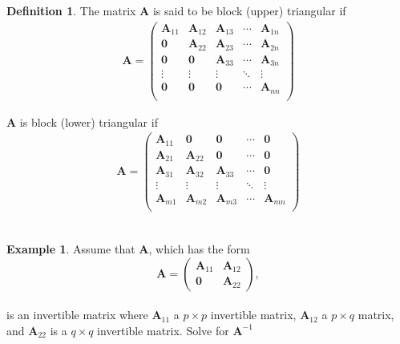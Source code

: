 \documentclass[
]{book}
\theoremstyle{definition}
\newtheorem{definition}{Definition}[chapter]
\theoremstyle{definition}
\newtheorem{example}{Example}[chapter]
\theoremstyle{definition}
\theoremstyle{remark}
\begin{document}
\begin{definition}
\protect\hypertarget{def:unnamed-chunk-153}{}{\label{def:unnamed-chunk-153} }The matrix \(\mathbf{A}\) is said to be block (upper) triangular if
\[
\begin{aligned}
\mathbf{A} = \begin{pmatrix} 
\mathbf{A}_{11} & \mathbf{A}_{12} & \mathbf{A}_{13} & \cdots & \mathbf{A}_{1n} \\
\mathbf{0} & \mathbf{A}_{22} & \mathbf{A}_{23} & \cdots & \mathbf{A}_{2n} \\
\mathbf{0} & \mathbf{0} & \mathbf{A}_{33} & \cdots & \mathbf{A}_{3n} \\
\vdots & \vdots & \vdots & \ddots & \vdots \\
\mathbf{0} & \mathbf{0} & \mathbf{0} & \cdots & \mathbf{A}_{nn} \\
\end{pmatrix}
\end{aligned}
\]

\(\mathbf{A}\) is block (lower) triangular if\\
\[
\begin{aligned}
\mathbf{A} = \begin{pmatrix} 
\mathbf{A}_{11} & \mathbf{0} & \mathbf{0} & \cdots & \mathbf{0} \\
\mathbf{A}_{21} & \mathbf{A}_{22} & \mathbf{0} & \cdots & \mathbf{0} \\
\mathbf{A}_{31} & \mathbf{A}_{32} & \mathbf{A}_{33} & \cdots & \mathbf{0} \\
\vdots & \vdots & \vdots & \ddots & \vdots \\
\mathbf{A}_{m1} & \mathbf{A}_{m2} & \mathbf{A}_{m3} & \cdots & \mathbf{A}_{mn} \\
\end{pmatrix}
\end{aligned}
\]\\
\end{definition}

\begin{example}
\protect\hypertarget{exm:unnamed-chunk-154}{}{\label{exm:unnamed-chunk-154} }Assume that \(\mathbf{A}\), which has the form
\[
\mathbf{A} = \begin{pmatrix} \mathbf{A}_{11} & \mathbf{A}_{12} \\ \mathbf{0} & \mathbf{A}_{22} \end{pmatrix},  
\]\\
is an invertible matrix where \(\mathbf{A}_{11}\) a \(p \times p\) invertible matrix, \(\mathbf{A}_{12}\) a \(p \times q\) matrix, and \(\mathbf{A}_{22}\) is a \(q \times q\) invertible matrix. Solve for \(\mathbf{A}^{-1}\)
\end{example}
\end{document}
